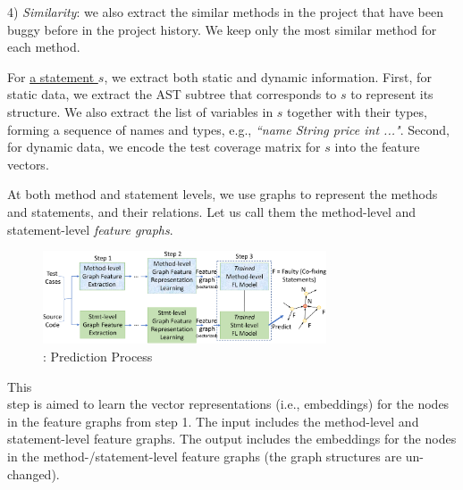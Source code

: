 4) {\em Similarity}: we also extract the similar methods in the
project that have been buggy before in the project history.
We keep only the most similar method for each method.


For \underline{a statement $s$}, we extract both static and dynamic
information. First, for static data, we extract the AST subtree that
corresponds to $s$ to represent its structure. We also extract the
list of variables in $s$ together with their types, forming a sequence
of names and types, e.g., {\em ``name String price int ..."}.  Second,
for dynamic data, we encode the test coverage matrix for $s$ into the
feature vectors.
%

At both method and statement levels, we use graphs to represent
the methods and statements, and their relations. Let us call
them the method-level and statement-level {\em feature graphs}.


\begin{figure}[t]
	\centering
	\includegraphics[width=3.3in]{graphs/overview-predict-2.png}
        \vspace{-10pt}
        \caption{{\tool}: Prediction Process}
	\label{predict-overview}
        \vspace{-6pt}
\end{figure}


\vspace{3pt}
  This\\ step is aimed to learn the vector
representations (i.e., embeddings) for the nodes in the feature graphs
from step 1. The input includes the method-level and statement-level
feature graphs. The output includes the embeddings for the nodes in
the method-/statement-level feature graphs (the graph structures are
un-changed).


